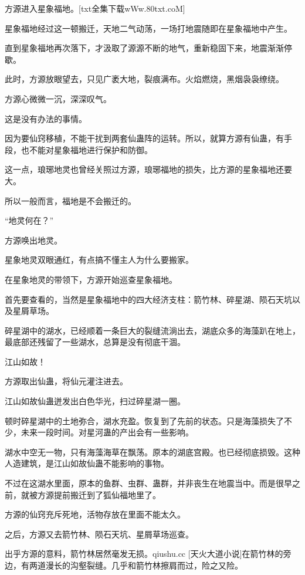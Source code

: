 
\begin{this_body}

方源进入星象福地。[txt全集下载wWw.80txt.coM]

星象福地经过这一顿搬迁，天地二气动荡，一场打地震随即在星象福地中产生。

直到星象福地再次落下，才汲取了源源不断的地气，重新稳固下来，地震渐渐停歇。

此时，方源放眼望去，只见广袤大地，裂痕满布。火焰燃烧，黑烟袅袅缭绕。

方源心微微一沉，深深叹气。

这是没有办法的事情。

因为要仙窍移植，不能干扰到两套仙蛊阵的运转。所以，就算方源有仙蛊，有手段，也不能对星象福地进行保护和防御。

这一点，琅琊地灵也曾经关照过方源，琅琊福地的损失，比方源的星象福地还要大。

所以一般而言，福地是不会搬迁的。

“地灵何在？”

方源唤出地灵。

星象地灵双眼通红，有点搞不懂主人为什么要搬家。

在星象地灵的带领下，方源开始巡查星象福地。

首先要查看的，当然是星象福地中的四大经济支柱：箭竹林、碎星湖、陨石天坑以及星屑草场。

碎星湖中的湖水，已经顺着一条巨大的裂缝流淌出去，湖底众多的海藻趴在地上，最底部还残留了一些湖水，总算是没有彻底干涸。

江山如故！

方源取出仙蛊，将仙元灌注进去。

江山如故仙蛊迸发出白色华光，扫过碎星湖一圈。

顿时碎星湖中的土地弥合，湖水充盈。恢复到了先前的状态。只是海藻损失了不少，未来一段时间。对星河蛊的产出会有一些影响。

湖水中空无一物，只有海藻海草在飘荡。原本的湖底宫殿。也已经彻底损毁。这种人造建筑，是江山如故仙蛊不能影响的事物。

不过在这湖水里面，原本的鱼群、虫群、蛊群，并非丧生在地震当中。而是很早之前，就被方源提前搬迁到了狐仙福地里了。

方源的仙窍充斥死地，活物存放在里面不能太久。

之后，方源又去箭竹林、陨石天坑、星屑草场巡查。

出乎方源的意料，箭竹林居然毫发无损。qiushu.cc [天火大道小说]在箭竹林的旁边，有两道漫长的沟壑裂缝。几乎和箭竹林擦肩而过，险之又险。


\end{this_body}
